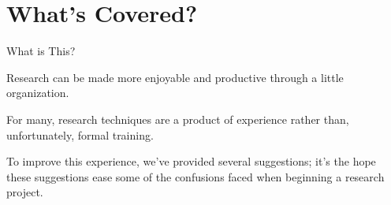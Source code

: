 %
%
\section{What's Covered?}
\begin{frame}{What is This?}
    \begin{center}
        Research can be made more enjoyable and productive through a little organization.\vspace{1.5em}

        For many, research techniques are a product of experience rather than, unfortunately, formal training.\vspace{1.5em}

        To improve this experience, we've provided several suggestions; it's the hope these suggestions
        ease some of the confusions faced when beginning a research project.
    \end{center}
\end{frame}


